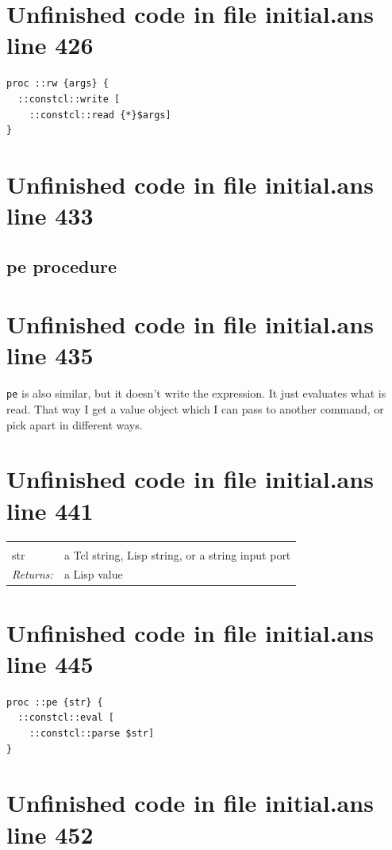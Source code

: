 \documentclass[twoside,9pt]{report}
\begin{document}
\section{Unfinished code in file initial.ans line 426}
\begin{lstlisting}
proc ::rw {args} {
  ::constcl::write [
    ::constcl::read {*}$args]
}
\end{lstlisting}
\section{Unfinished code in file initial.ans line 433}
\subsection{pe procedure}
\label{pe-procedure}
\section{Unfinished code in file initial.ans line 435}


\texttt{pe} is also similar, but it doesn't write the expression. It just evaluates what is read. That way I get a value object which I can pass to another command, or pick apart in different ways.

\section{Unfinished code in file initial.ans line 441}
\noindent\begin{tabular}{ |p{1.9cm} p{8cm}| }
\hline
\rowcolor[HTML]{CCCCCC} \multicolumn{2}{|l|}{\bf pe (internal)} \\
str & a Tcl string, Lisp string, or a string input port \\
\textit{Returns:} & a Lisp value \\
\hline
\end{tabular}
\section{Unfinished code in file initial.ans line 445}
\begin{lstlisting}
proc ::pe {str} {
  ::constcl::eval [
    ::constcl::parse $str]
}
\end{lstlisting}
\section{Unfinished code in file initial.ans line 452}
\end{document}
